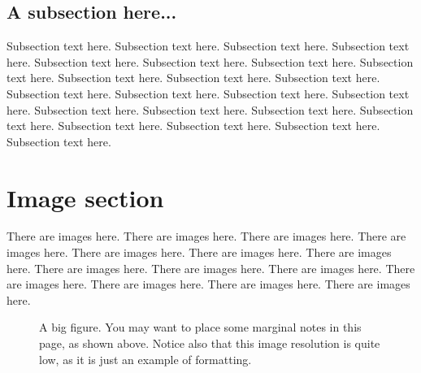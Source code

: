 \documentclass{chi-ext}
\begin{document}
\subsection{A subsection here...}
Subsection text here. Subsection text here. Subsection text
here. Subsection text here. Subsection text here. Subsection text
here. Subsection text here. Subsection text here. Subsection text
here. Subsection text here. Subsection text here. Subsection text
here. Subsection text here. Subsection text here. Subsection text
here. Subsection text here. Subsection text here. Subsection text
here. Subsection text here. Subsection text here. Subsection text
here. Subsection text here. Subsection text here.

\section{Image section}

There are images here. There are images here. There are images
here. There are images here. There are images here. There are images
here. There are images here. There are images here. There are images
here. There are images here. There are images here. There are images
here. There are images here. There are images here.

\begin{figure}
\parbox{\textwidth}{
  \begin{center}
  \caption{A big figure. You may want to place some marginal notes in this page, as shown above. Notice also that this image resolution is quite low, as it is just an example of formatting.}
  \label{fig:bigsample}
  \end{center}  
}
\end{figure}

\balance


\end{document}
